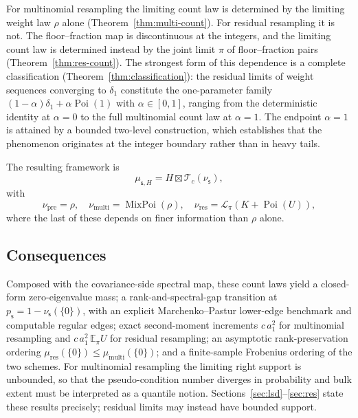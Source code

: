 \documentclass[lettersize,journal]{IEEEtran}
\theoremstyle{remark}
\begin{document}
For multinomial resampling the limiting count law is determined by the
limiting weight law $\rho$ alone (Theorem~\ref{thm:multi-count}). For residual
resampling it is not. The floor--fraction map is discontinuous at the
integers, and the limiting count law is determined instead by the joint limit
$\pi$ of floor--fraction pairs (Theorem~\ref{thm:res-count}). The strongest
form of this dependence is a complete classification
(Theorem~\ref{thm:classification}): the residual limits of weight sequences
converging to $\delta_1$ constitute the one-parameter family
$(1-\alpha)\delta_1+\alpha\operatorname{Poi}(1)$ with $\alpha\in[0,1]$,
ranging from the deterministic identity at $\alpha=0$ to the full multinomial
count law at $\alpha=1$. The endpoint $\alpha=1$ is attained by a bounded
two-level construction, which establishes that the phenomenon originates at
the integer boundary rather than in heavy tails.

The resulting framework is
\begin{equation}
  \mu_{\mathsf{s},H} = H\boxtimes\mathcal{T}_c(\nu_{\mathsf{s}}),
  \label{eq:framework}
\end{equation}
with
\begin{equation}
  \nu_{\mathrm{pre}} = \rho, \quad
  \nu_{\mathrm{multi}} = \operatorname{MixPoi}(\rho), \quad
  \nu_{\mathrm{res}} = \mathcal{L}_\pi(K+\operatorname{Poi}(U)),
  \label{eq:definitions}
\end{equation}
where the last of these depends on finer information than $\rho$ alone.

\subsection{Consequences}

Composed with the covariance-side spectral map, these count laws yield a
closed-form zero-eigenvalue mass; a rank-and-spectral-gap transition at
$p_{\mathsf{s}}=1-\nu_{\mathsf{s}}(\{0\})$, with an explicit
Marchenko--Pastur lower-edge benchmark\cite{marchenko1967distribution} and computable regular edges; exact
second-moment increments $c\,a_1^2$ for multinomial resampling and
$c\,a_1^2\,\mathbb{E}_\pi U$ for residual resampling; an asymptotic
rank-preservation ordering $\mu_{\mathrm{res}}(\{0\})\le
\mu_{\mathrm{multi}}(\{0\})$; and a finite-sample Frobenius ordering of the
two schemes. For multinomial resampling the limiting right support is unbounded, so that the pseudo-condition number diverges in probability and bulk extent must be
interpreted as a quantile notion. Sections~\ref{sec:lsd}--\ref{sec:res} state
these results precisely; residual limits may instead have bounded support.
\end{document}
